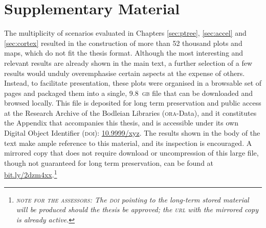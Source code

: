 \chapter{Supplementary Material}
\label{sec:supplmat}
\setstretch{\lspac}

The multiplicity of scenarios evaluated in Chapters \ref{sec:ptree}, \ref{sec:accel} and \ref{sec:cortex} resulted in the construction of more than 52 thousand plots and maps, which do not fit the thesis format. Although the most interesting and relevant results are already shown in the main text, a further selection of a few results would unduly overemphasise certain aspects at the expense of others. Instead, to facilitate presentation, these plots were organised in a browsable set of pages and packaged them into a single, 9.8~\textsc{gb} file that can be downloaded and browsed locally. This file is deposited for long term preservation and public access at the Research Archive of the Bodleian Libraries (\textsc{ora}-Data), and it constitutes the Appendix that accompanies this thesis, and is accessible under its own Digital Object Identifier (\textsc{doi}): \href{http://dx.doi.org/10.9999/xyz}{10.9999/xyz}. The results shown in the body of the text make ample reference to this material, and its inspection is encouraged. A mirrored copy that does not require download or uncompression of this large file, though not guaranteed for long term preservation, can be found at \href{http://bit.ly/2dzm4xx}{bit.ly/2dzm4xx}.\footnote{{\emph{\color{orange}\textsc{note for the assessors}: The \textsc{doi} pointing to the long-term stored material will be produced should the thesis be approved; the \textsc{url} with the mirrored copy is already active.}}}